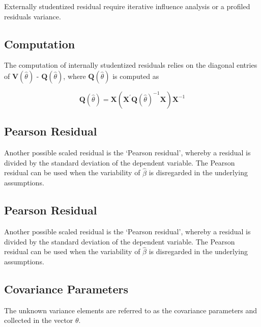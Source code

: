 \documentclass[Main.tex]{subfiles}
\begin{document}
Externally  studentized residual require iterative influence analysis or a profiled residuals variance.




\subsection{Computation}%


The computation of internally studentized residuals relies on the diagonal entries of $\boldsymbol{V} (\hat{\theta})$ - $\boldsymbol{Q} (\hat{\theta})$, where $\boldsymbol{Q} (\hat{\theta})$ is computed as


\[ \boldsymbol{Q} (\hat{\theta}) = \boldsymbol{X} ( \boldsymbol{X}^{\prime}\boldsymbol{Q} (\hat{\theta})^{-1}\boldsymbol{X})\boldsymbol{X}^{-1} \]


\subsection{Pearson Residual}%

Another possible scaled residual is the  `Pearson residual', whereby a residual is divided by the standard deviation of the dependent variable. The Pearson residual can be used when the variability of $\hat{\beta}$ is disregarded in the underlying assumptions.
\newpage

\subsection{Pearson Residual}%


Another possible scaled residual is the  `Pearson residual', whereby a residual is divided by the standard deviation of the dependent variable. The Pearson residual can be used when the variability of $\hat{\beta}$ is disregarded in the underlying assumptions.


\newpage
\subsection{Covariance Parameters} %
The unknown variance elements are referred to as the covariance parameters and collected in the vector $\theta$.
\end{document}
